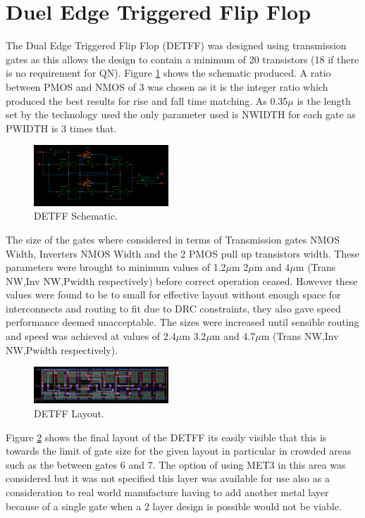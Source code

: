 \section{Duel Edge Triggered Flip Flop}

The Dual Edge Triggered Flip Flop (DETFF) was designed using transmission gates as this allows the design to contain a minimum of 20 transistors (18 if there is no requirement for QN). Figure \ref{fig:DETFFSchem} shows the schematic produced. A ratio between PMOS and NMOS of 3 was chosen as it is the integer ratio which produced the best results for rise and fall time matching. As 0.35$\mu$ is the length set by the technology used the only parameter used is NWIDTH for each gate as PWIDTH is 3 times that.

\begin{figure}[h]  
\centering
   \includegraphics[width=0.45\textwidth]{Figures/DETFFSchem.png}
\caption{DETFF Schematic.}
\label {fig:DETFFSchem}
\end{figure}

The size of the gates where considered in terms of Transmission gates NMOS Width, Inverters NMOS Width and the 2 PMOS pull up transistors width. These parameters were brought to minimum  values of 1.2$\mu$m 2$\mu$m and 4$\mu$m (Trans NW,Inv NW,Pwidth respectively) before correct operation ceased. However these values were found to be to small for effective layout without enough space for interconnects and routing to fit due to DRC constraints, they also gave speed performance deemed unacceptable. The sizes were increased until sensible routing and speed was achieved  at values of 2.4$\mu$m 3.2$\mu$m and 4.7$\mu$m (Trans NW,Inv NW,Pwidth respectively).

\begin{figure}[h]  
\centering
   \includegraphics[width=0.45\textwidth]{Figures/DETFFLayout.png}
\caption{DETFF Layout.}
\label {fig:DETFFLayout}
\end{figure}

Figure \ref{fig:DETFFLayout} shows the final layout of the DETFF its easily visible that this is towards the limit of gate size for the given layout in particular in crowded areas such as the between gates 6 and 7. The option of using MET3 in this area was considered but it was not specified this layer was available for use also as a consideration to real world manufacture having to add another metal layer because of a single gate when a 2 layer design is possible would not be viable.

